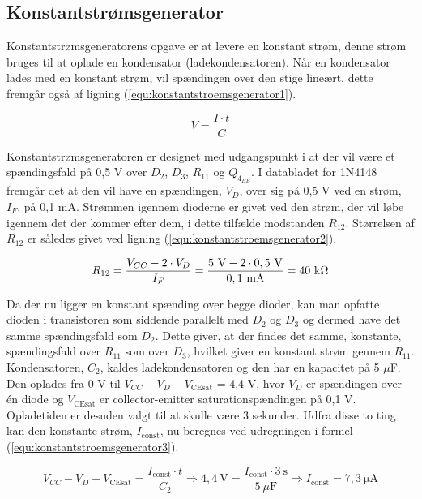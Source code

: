 \subsection*{Konstantstrømsgenerator}
\label{volumenkontrol-design-konstantstroemsgenerator}

Konstantstrømsgeneratorens opgave er at levere en konstant strøm, denne strøm bruges til at oplade en kondensator (ladekondensatoren). Når en kondensator lades med en konstant strøm, vil spændingen over den stige lineært, dette fremgår også af ligning (\ref{equ:konstantstroemsgenerator1}).

\begin{equation}
\label{equ:konstantstroemsgenerator1}
V = \frac{I \cdot t}{C}
\end{equation}

Konstantstrømsgeneratoren er designet med udgangspunkt i at der vil være et spændingsfald på 0,5 V over $D_2$, $D_3$, $R_{11}$ og $Q_{4_{BE}}$. I databladet for 1N4148 \cite{1n4148-datablad} fremgår det at den vil have en spændingen, $V_D$, over sig på 0,5 V ved en strøm, $I_F$, på 0,1 mA. Strømmen igennem dioderne er givet ved den strøm, der vil løbe igennem det der kommer efter dem, i dette tilfælde modstanden $R_{12}$. Størrelsen af $R_{12}$ er således givet ved ligning (\ref{equ:konstantstroemsgenerator2}).

\begin{equation}
\label{equ:konstantstroemsgenerator2}
R_{12} = \frac{V_{CC} - 2 \cdot V_D}{I_F} = \mathrm{\frac{5~V - 2 \cdot 0,5~V}{0,1~mA} = 40~k\ohm}
\end{equation}

Da der nu ligger en konstant spænding over begge dioder, kan man opfatte dioden i transistoren som siddende parallelt med $D_2$ og $D_3$ og dermed have det samme spændingsfald som $D_2$. Dette giver, at der findes det samme, konstante, spændingsfald over $R_{11}$ som over $D_3$, hvilket giver en konstant strøm gennem $R_{11}$.
Kondensatoren, $C_2$, kaldes ladekondensatoren og den har en kapacitet på 5 $\mu$F.  Den oplades fra 0 V til $V_{CC} - V_D - V_{\mathrm{CEsat}}$ = 4,4 V, hvor $V_D$ er spændingen over én diode og $V_{\mathrm{CEsat}}$ er collector-emitter saturationspændingen på 0,1 V. Opladetiden er desuden valgt til at skulle være 3 sekunder. Udfra disse to ting kan den konstante strøm, $I_{\mathrm{const}}$, nu beregnes ved udregningen i formel (\ref{equ:konstantstroemsgenerator3}).

\begin{equation}
\label{equ:konstantstroemsgenerator3}
V_{CC} - V_D - V_{\mathrm{CEsat}} = \frac{I_{\mathrm{const}} \cdot t}{C_2} \Rightarrow \mathrm{4,4~V} = \frac{I_{\mathrm{const}} \cdot 3~\mathrm{s}}{5~\mu \mathrm{F}} \Rightarrow I_{\mathrm{const}} = \mathrm{7,3~\mu A}
\end{equation}

